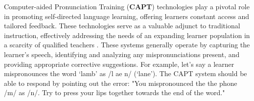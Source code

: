 \documentclass[11pt]{article}
\begin{document}

\iffalse 
Computer-aided Pronunciation Training (\textbf{CAPT}) technologies play a pivotal role in promoting self-directed language learning, offering learners constant access and tailored feedback. These technologies serve as a valuable adjunct to traditional instruction, effectively addressing the needs of an expanding learner population in a scarcity of qualified teachers \cite{CAPT_2, CAPT}. These systems generally operate by capturing the learner's speech, identifying and analyzing any mispronunciations present, and providing appropriate corrective suggestions. For example, let's say a learner mispronounces the word `lamb' as /l ae n/ (`lane'). The CAPT system should be able to respond by pointing out the error: "You mispronounced the the phone /m/ as /n/. Try to press your lips together towards the end of the word." 
\end{document}
